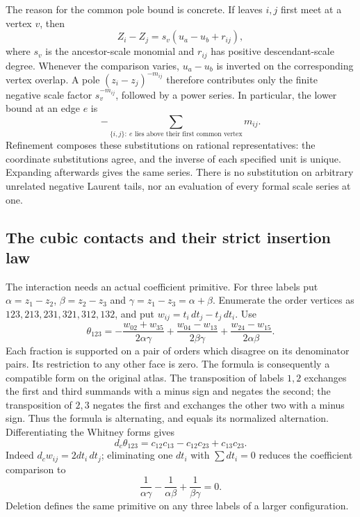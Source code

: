 The reason for the common pole bound is concrete.  If leaves \(i,j\)
first meet at a vertex \(v\), then
\begin{equation}\label{cp:eq:lca}
 Z_i-Z_j=s_v(u_a-u_b+r_{ij}),
\end{equation}
where \(s_v\) is the ancestor-scale monomial and \(r_{ij}\) has
positive descendant-scale degree.  Whenever the comparison varies,
\(u_a-u_b\) is inverted on the corresponding vertex overlap.
A pole \((z_i-z_j)^{-m_{ij}}\) therefore contributes only the
finite negative scale factor \(s_v^{-m_{ij}}\), followed by a
power series.  In particular, the lower bound at an edge \(e\) is
\[
 -\sum_{\{i,j\}:\ e\text{ lies above their first common vertex}}
                                                     m_{ij}.
\]
Refinement composes these substitutions on rational representatives:
the coordinate substitutions agree, and the inverse of each specified
unit is unique.  Expanding afterwards gives the same series.
There is no substitution on arbitrary unrelated negative Laurent
tails, nor an evaluation of every formal scale series at one.

\subsection{The cubic contacts and their strict insertion law}

The interaction needs an actual coefficient primitive.  For three
labels put \(\alpha=z_1-z_2\), \(\beta=z_2-z_3\) and
\(\gamma=z_1-z_3=\alpha+\beta\).  Enumerate the order vertices
as \(123,213,231,321,312,132\), and put
\(w_{ij}=t_i\,dt_j-t_j\,dt_i\).  Use
\begin{equation}\label{cp:eq:theta}
 \theta_{123}=
 -\frac{w_{02}+w_{35}}{2\alpha\gamma}
 +\frac{w_{04}-w_{13}}{2\beta\gamma}
 +\frac{w_{24}-w_{15}}{2\alpha\beta}.
\end{equation}
Each fraction is supported on a pair of orders which disagree on
its denominator pairs.  Its restriction to any other face is zero.
The formula is consequently a compatible form on the original atlas.
The transposition of labels \(1,2\) exchanges the first and third
summands with a minus sign and negates the second; the transposition
of \(2,3\) negates the first and exchanges the other two with a
minus sign.  Thus the formula is alternating, and equals its
normalized alternation.  Differentiating the Whitney forms gives
\begin{equation}\label{cp:eq:theta-d}
 d_c\theta_{123}
       =c_{12}c_{13}-c_{12}c_{23}+c_{13}c_{23}.
\end{equation}
Indeed \(d_cw_{ij}=2dt_i\,dt_j\); eliminating one \(dt_i\) with
\(\sum dt_i=0\) reduces the coefficient comparison to
\[
 \frac1{\alpha\gamma}-\frac1{\alpha\beta}
                       +\frac1{\beta\gamma}=0.
\]
Deletion defines the same primitive on any three labels of a larger
configuration.

